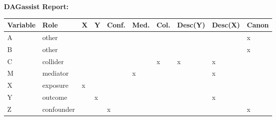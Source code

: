 \begingroup\footnotesize
\setlength{\LTleft}{0pt}\setlength{\LTright}{0pt}
\setlength{\tabcolsep}{4pt}
\renewcommand{\arraystretch}{0.95}
\setlength{\aboverulesep}{0pt}\setlength{\belowrulesep}{0pt}
\setlength{\LTpre}{0pt}\setlength{\LTpost}{0pt}
\begin{center}\textbf{DAGassist Report:}\end{center}
\begin{center}
\begin{longtable}{@{}p{\dimexpr(\textwidth - 18\tabcolsep)/10\relax}p{\dimexpr(\textwidth - 18\tabcolsep)/10\relax}p{\dimexpr(\textwidth - 18\tabcolsep)/10\relax}p{\dimexpr(\textwidth - 18\tabcolsep)/10\relax}p{\dimexpr(\textwidth - 18\tabcolsep)/10\relax}p{\dimexpr(\textwidth - 18\tabcolsep)/10\relax}p{\dimexpr(\textwidth - 18\tabcolsep)/10\relax}p{\dimexpr(\textwidth - 18\tabcolsep)/10\relax}p{\dimexpr(\textwidth - 18\tabcolsep)/10\relax}p{\dimexpr(\textwidth - 18\tabcolsep)/10\relax}@{}}
\toprule
Variable & Role & {\centering X\par} & {\centering Y\par} & {\centering Conf.\par} & {\centering Med.\par} & {\centering Col.\par} & {\centering Desc(Y)\par} & {\centering Desc(X)\par} & {\centering Canon\par} \\
\midrule
A & other &  &  &  &  &  &  &  & x \\
B & other &  &  &  &  &  &  &  & x \\
C & collider &  &  &  &  & x & x & x &  \\
M & mediator &  &  &  & x &  &  & x &  \\
X & exposure & x &  &  &  &  &  &  &  \\
Y & outcome &  & x &  &  &  &  & x &  \\
Z & confounder &  &  & x &  &  &  &  & x \\
\bottomrule
\end{longtable}
\vspace{1pt}
\begingroup\renewcommand{\arraystretch}{1.08}
\begin{longtable}{@{}p{\dimexpr(\textwidth - 6\tabcolsep)/4\relax}p{\dimexpr(\textwidth - 6\tabcolsep)/4\relax}p{\dimexpr(\textwidth - 6\tabcolsep)/4\relax}p{\dimexpr(\textwidth - 6\tabcolsep)/4\relax}@{}}

\end{longtable}
\end{center}
